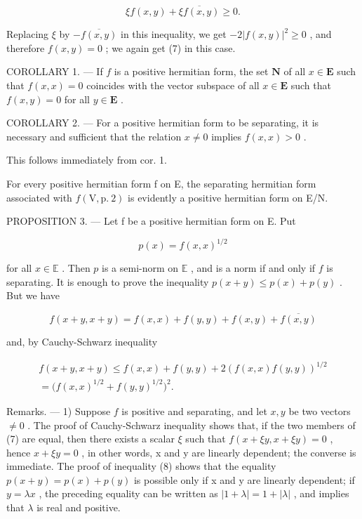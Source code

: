 \[
\xi f (x, y) + \overline {{{{\xi f (x , y)}}}} \geqslant 0.
\]

Replacing \(\xi\) by \(-\overline{f(x,y)}\) in this inequality, we get \(-2|f(x,y)|^2 \geqslant 0\) , and therefore \(f(x,y) = 0\) ; we again get (7) in this case.

COROLLARY 1. --- If \(f\) is a positive hermitian form, the set \(\mathbf{N}\) of all \(x \in \mathbf{E}\) such that \(f(x, x) = 0\) coincides with the vector subspace of all \(x \in \mathbf{E}\) such that \(f(x, y) = 0\) for all \(y \in \mathbf{E}\) .

COROLLARY 2. --- For a positive hermitian form to be separating, it is necessary and sufficient that the relation \(x \neq 0\) implies \(f(x, x) > 0\) .

This follows immediately from cor. 1.

For every positive hermitian form f on E, the separating hermitian form associated with \(f(\mathrm{V}, \mathrm{p.~2})\) is evidently a positive hermitian form on E/N.

PROPOSITION 3. --- Let f be a positive hermitian form on E. Put

\[
p (x) = f (x, x) ^ {1 / 2}
\]

for all \(x \in \mathbb{E}\) . Then \(p\) is a semi-norm on \(\mathbb{E}\) , and is a norm if and only if \(f\) is separating. It is enough to prove the inequality \(p(x + y) \leqslant p(x) + p(y)\) . But we have

\[
f (x + y, x + y) = f (x, x) + f (y, y) + f (x, y) + \overline {{f (x , y)}}
\]

and, by Cauchy-Schwarz inequality

\[
\begin{array}{c} f (x + y, x + y) \leqslant f (x, x) + f (y, y) + 2 (f (x, x) f (y, y)) ^ {1 / 2} \\ = \bigl (f (x, x) ^ {1 / 2} + f (y, y) ^ {1 / 2} \bigr) ^ {2}. \end{array}\tag{8}
\]

Remarks. --- 1) Suppose \(f\) is positive and separating, and let \(x, y\) be two vectors \(\neq 0\) . The proof of Cauchy-Schwarz inequality shows that, if the two members of (7) are equal, then there exists a scalar \(\xi\) such that \(f(x + \xi y, x + \xi y) = 0\) , hence \(x + \xi y = 0\) , in other words, x and y are linearly dependent; the converse is immediate. The proof of inequality (8) shows that the equality \(p(x + y) = p(x) + p(y)\) is possible only if x and y are linearly dependent; if \(y = \lambda x\) , the preceding equality can be written as \(|1 + \lambda| = 1 + |\lambda|\) , and implies that \(\lambda\) is real and positive.

